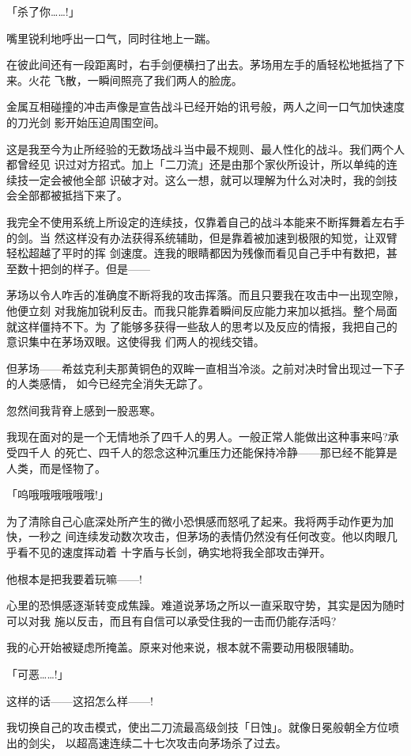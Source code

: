 \documentclass[11pt]{book}
\begin{document}
「杀了你……!」

嘴里锐利地呼出一口气，同时往地上一踹。

在彼此间还有一段距离时，右手剑便横扫了出去。茅场用左手的盾轻松地抵挡了下来。火花
飞散，一瞬间照亮了我们两人的脸庞。






金属互相碰撞的冲击声像是宣告战斗已经开始的讯号般，两人之间一口气加快速度的刀光剑
影开始压迫周围空间。

这是我至今为止所经验的无数场战斗当中最不规则、最人性化的战斗。我们两个人都曾经见
识过对方招式。加上「二刀流」还是由那个家伙所设计，所以单纯的连续技一定会被他全部
识破才对。这么一想，就可以理解为什么对决时，我的剑技会全部都被抵挡下来了。

我完全不使用系统上所设定的连续技，仅靠着自己的战斗本能来不断挥舞着左右手的剑。当
然这样没有办法获得系统辅助，但是靠着被加速到极限的知觉，让双臂轻松超越了平时的挥
剑速度。连我的眼睛都因为残像而看见自己手中有数把，甚至数十把剑的样子。但是——

茅场以令人咋舌的准确度不断将我的攻击挥落。而且只要我在攻击中一出现空隙，他便立刻
对我施加锐利反击。而我只能靠着瞬间反应能力来加以抵挡。整个局面就这样僵持不下。为
了能够多获得一些敌人的思考以及反应的情报，我把自己的意识集中在茅场双眼。这使得我
们两人的视线交错。

但茅场——希兹克利夫那黄铜色的双眸一直相当冷淡。之前对决时曾出现过一下子的人类感情，
如今已经完全消失无踪了。

忽然间我背脊上感到一股恶寒。

我现在面对的是一个无情地杀了四千人的男人。一般正常人能做出这种事来吗?承受四千人
的死亡、四千人的怨念这种沉重压力还能保持冷静——那已经不能算是人类，而是怪物了。

「呜哦哦哦哦哦哦!」

为了清除自己心底深处所产生的微小恐惧感而怒吼了起来。我将两手动作更为加快，一秒之
间连续发动数次攻击，但茅场的表情仍然没有任何改变。他以肉眼几乎看不见的速度挥动着
十字盾与长剑，确实地将我全部攻击弹开。

他根本是把我要着玩嘛——!

心里的恐惧感逐渐转变成焦躁。难道说茅场之所以一直采取守势，其实是因为随时可以对我
施以反击，而且有自信可以承受住我的一击而仍能存活吗?

我的心开始被疑虑所掩盖。原来对他来说，根本就不需要动用极限辅助。

「可恶……!」

这样的话——这招怎么样——!

我切换自己的攻击模式，使出二刀流最高级剑技「日蚀」。就像日冕般朝全方位喷出的剑尖，
以超高速连续二十七次攻击向茅场杀了过去。
\end{document}
